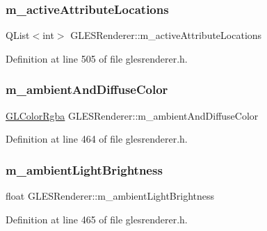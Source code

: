 \subsubsection{\texorpdfstring{m\_activeAttributeLocations}{m\_activeAttributeLocations}}
{\footnotesize\ttfamily Q\+List$<$int$>$ G\+L\+E\+S\+Renderer\+::m\+\_\+active\+Attribute\+Locations\hspace{0.3cm}{\ttfamily [protected]}}



Definition at line 505 of file glesrenderer.\+h.

\mbox{\label{class_g_l_e_s_renderer_af4b3fcfa029b28bfdd9d2b7bb9202796}} 
\subsubsection{\texorpdfstring{m\_ambientAndDiffuseColor}{m\_ambientAndDiffuseColor}}
{\footnotesize\ttfamily \mbox{\hyperlink{class_g_l_color_rgba}{G\+L\+Color\+Rgba}} G\+L\+E\+S\+Renderer\+::m\+\_\+ambient\+And\+Diffuse\+Color\hspace{0.3cm}{\ttfamily [protected]}}



Definition at line 464 of file glesrenderer.\+h.

\mbox{\label{class_g_l_e_s_renderer_ad40448fd0cbb01b078a759e5f8d9debc}} 
\subsubsection{\texorpdfstring{m\_ambientLightBrightness}{m\_ambientLightBrightness}}
{\footnotesize\ttfamily float G\+L\+E\+S\+Renderer\+::m\+\_\+ambient\+Light\+Brightness\hspace{0.3cm}{\ttfamily [protected]}}



Definition at line 465 of file glesrenderer.\+h.

\mbox{\label{class_g_l_e_s_renderer_a719e99de6bb7e5af3a5fcae041fdefda}} 
